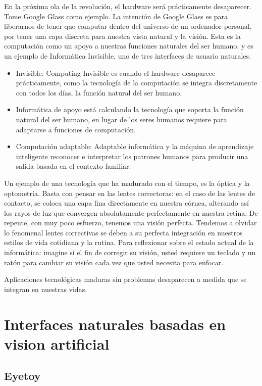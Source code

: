 En la próxima ola de la revolución, el hardware será prácticamente desaparecer. Tome Google Glass como ejemplo. La intención de Google Glass es para liberarnos de tener que computar dentro del universo de un ordenador personal, por tener una capa discreta para nuestra vista natural y la visión. Esta es la computación como un apoyo a nuestras funciones naturales del ser humano, y es un ejemplo de Informática Invisible, uno de tres interfaces de usuario naturales.
\begin{itemize}
\item Invisible: Computing Invisible es cuando el hardware desaparece prácticamente, como la tecnología de la computación se integra discretamente con todos los días, la función natural del ser humano.
\item Informática de apoyo está calculando la tecnología que soporta la función natural del ser humano, en lugar de los seres humanos requiere para adaptarse a funciones de computación.
\item Computación adaptable:  Adaptable informática y la máquina de aprendizaje inteligente reconocer e interpretar los patrones humanos para producir una salida basada en el contexto familiar.
\end{itemize}

Un ejemplo de una tecnología que ha madurado con el tiempo, es la óptica y la optometría. Basta con pensar en las lentes correctoras: en el caso de las lentes de contacto, se coloca una capa fina directamente en nuestra córnea, alterando así los rayos de luz que convergen absolutamente perfectamente en nuestra retina. De repente, con muy poco esfuerzo, tenemos una visión perfecta. Tendemos a olvidar lo fenomenal lentes correctivas se deben a su perfecta integración en nuestros estilos de vida cotidiana y la rutina. Para reflexionar sobre el estado actual de la informática: imagine si el fin de corregir su visión, usted requiere un teclado y un ratón para cambiar su visión cada vez que usted necesita para enfocar.

Aplicaciones tecnológicas maduras sin problemas desaparecen a medida que se integran en nuestras vidas.

\section{Interfaces naturales basadas en vision artificial}

\subsection{Eyetoy}

